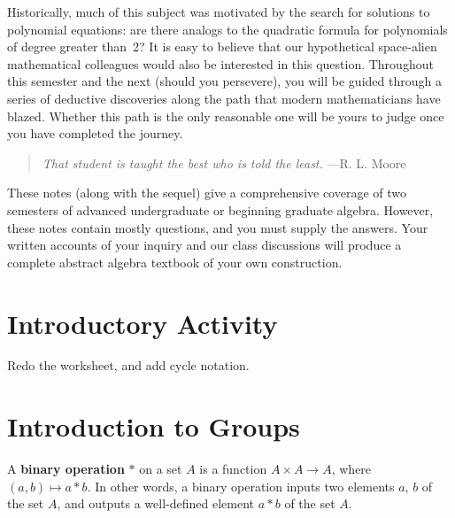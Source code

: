 Historically, much of this subject was motivated by the search for solutions to polynomial equations: are there analogs to the quadratic formula for polynomials of degree greater than~2? It is easy to believe that our hypothetical space-alien mathematical colleagues would also be interested in this question. Throughout this semester and the next (should you persevere), you will be guided through a series of deductive discoveries along the path that modern mathematicians have blazed. Whether this path is the only reasonable one will be yours to judge once you have completed the journey.

\begin{quote}
  \textit{That student is taught the best who is told the least.} ---R. L. Moore
\end{quote}

These notes (along with the sequel) give a comprehensive coverage of two semesters of advanced undergraduate or beginning graduate algebra. However, these notes contain mostly questions, and you must supply the answers. Your written accounts of your inquiry and our class discussions will produce a complete abstract algebra textbook of your own construction.

\mainmatter


\chapter*{Introductory Activity}

Redo the worksheet, and add cycle notation.

\chapter{Introduction to Groups}

\begin{definition}
    A \textbf{binary operation} \(*\) on a set \(A\) is a function \(A \times A \rightarrow A\), where \((a,b) \mapsto a*b\).  In other words, a binary operation inputs two elements \(a\), \(b\) of the set \(A\), and outputs a well-defined element \(a * b\) of the set \(A\).
\end{definition}

